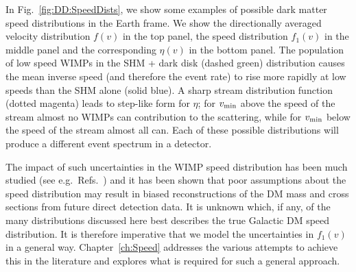 In Fig.~\ref{fig:DD:SpeedDists}, we show some examples of possible dark matter speed distributions in the Earth frame. We show the directionally averaged velocity distribution $f(v)$ in the top panel, the speed distribution $f_1(v)$ in the middle panel and the corresponding $\eta(v)$ in the bottom panel. The population of low speed WIMPs in the SHM + dark disk (dashed green) distribution causes the mean inverse speed (and therefore the event rate) to rise more rapidly at low speeds than the SHM alone (solid blue). A sharp stream distribution function (dotted magenta) leads to step-like form for $\eta$; for $\vmin$ above the speed of the stream almost no WIMPs can contribution to the scattering, while for $\vmin$ below the speed of the stream almost all can. Each of these possible distributions will produce a different event spectrum in a detector.



The impact of such uncertainties in the WIMP speed distribution has been much studied (see e.g.\ Refs.~\cite{Green:2010, Peter:2011, Fairbairn:2012}) and it has been shown that poor assumptions about the speed distribution may result in biased reconstructions of the DM mass and cross sections from future direct detection data. It is unknown which, if any, of the many distributions discussed here best describes the true Galactic DM speed distribution. It is therefore imperative that we model the uncertainties in $f_1(v)$ in a general way. Chapter~\ref{ch:Speed} addresses the various attempts to achieve this in the literature and explores what is required for such a general approach. 


